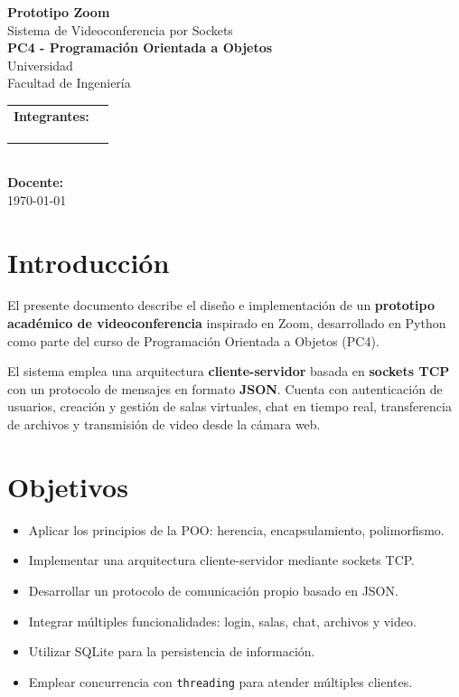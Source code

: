 \documentclass[12pt,a4paper]{article}
\begin{document}
\onecolumn
\begin{titlepage}
    \centering
    \vspace*{2cm}
    {\Huge \textbf{Prototipo Zoom}}\\[0.5cm]
    {\Large Sistema de Videoconferencia por Sockets}\\[1.5cm]
    {\large \textbf{PC4 - Programaci\'on Orientada a Objetos}}\\[0.5cm]
    {\large Universidad}\\[0.3cm]
    {\large Facultad de Ingenier\'ia}\\[2cm]

    \begin{tabular}{ll}
        \textbf{Integrantes:} & \\
        & \\
        & \\
        & \\
    \end{tabular}\\[2cm]

    \textbf{Docente:}\\[1.8cm]

    \today
\end{titlepage}

\tableofcontents
\newpage

\section{Introducci\'on}

El presente documento describe el dise\~no e implementaci\'on de un \textbf{prototipo acad\'emico de videoconferencia} inspirado en Zoom, desarrollado en Python como parte del curso de Programaci\'on Orientada a Objetos (PC4).

El sistema emplea una arquitectura \textbf{cliente-servidor} basada en \textbf{sockets TCP} con un protocolo de mensajes en formato \textbf{JSON}. Cuenta con autenticaci\'on de usuarios, creaci\'on y gesti\'on de salas virtuales, chat en tiempo real, transferencia de archivos y transmisi\'on de video desde la c\'amara web.

\section{Objetivos}

\begin{itemize}
    \item Aplicar los principios de la POO: herencia, encapsulamiento, polimorfismo.
    \item Implementar una arquitectura cliente-servidor mediante sockets TCP.
    \item Desarrollar un protocolo de comunicaci\'on propio basado en JSON.
    \item Integrar m\'ultiples funcionalidades: login, salas, chat, archivos y video.
    \item Utilizar SQLite para la persistencia de informaci\'on.
    \item Emplear concurrencia con \texttt{threading} para atender m\'ultiples clientes.
\end{itemize}
\end{document}
